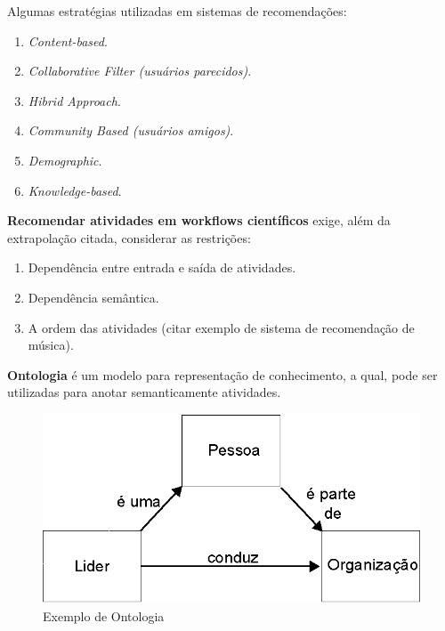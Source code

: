 \begin{frame}
	\begin{block}{}
		Algumas estratégias utilizadas em sistemas de recomendações:
		
		\begin{enumerate}
			\item \emph{Content-based}.
			\item \emph{Collaborative Filter (usuários parecidos)}.
			\item \emph{Hibrid Approach}.
			\item \emph{Community Based (usuários amigos)}.
			\item \emph{Demographic}.
			\item \emph{Knowledge-based}.
		\end{enumerate}
	\end{block}
\end{frame}


\begin{frame}		
	\begin{block}{}
		\textbf{Recomendar atividades em workflows científicos} exige, além da extrapolação citada, considerar as restrições:
		\begin{enumerate}
			\item Dependência entre entrada e saída de atividades.
			\item Dependência semântica.
			\item A ordem das atividades (citar exemplo de sistema de recomendação de música).
		\end{enumerate}
	\end{block}
\end{frame}


\begin{frame}
	\begin{block}{}
		\textbf{Ontologia} é um modelo para representação de conhecimento, a qual, pode ser utilizadas para anotar semanticamente atividades.
		
		\begin{figure}
			\begin{minipage}[b]{0.7\textwidth}
				\includegraphics[width=\textwidth]{./secoes/ConceitosFundamentais/Ontologia.eps}
				\caption{Exemplo de Ontologia}
			\end{minipage}
		\end{figure}
	\end{block}
\end{frame}

